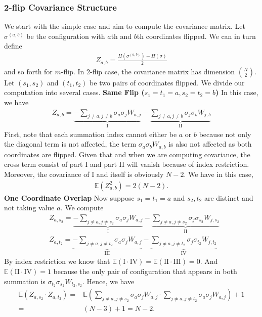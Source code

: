 \documentclass[10pt]{article}
\newcommand{\e}{\mathbb{E}}
\newenvironment{Proof of lemma}{\noindent{\bf Proof of Lemma}}{\hfill$\Box$\newline}
\newenvironment{Proof of claim}{\noindent{\bf Proof of claim}}{\hfill$\Box$\newline}
\newenvironment{Proof of theorem}{\noindent{\bf Proof of Theorem}}{\hfill\scriptsize{$\Box$}\newline}
\newenvironment{Proof of theorems}{\noindent{\bf Proof of Theorems}}{\hfill$\Box$\newline}
\newenvironment{Proof of proposition}{\noindent{\bf Proof of Proposition}}{\hfill$\Box$\newline}
\newenvironment{Proof of propositions}{\noindent{\bf Proof of Propositions}}{\hfill$\Box$\newline}
\newenvironment{Proof of exercise}{\noindent{\it Proof of Exercise:}}{\hfill$\Box$}
\numberwithin{equation}{section}
\begin{document}
\subsubsection{2-flip Covariance Structure}
We start with the simple case and aim to compute the covariance matrix. Let $\sigma^{(a,b)}$ be the configuration with $a$th and $b$th coordinates flipped. We can in turn define 
\begin{align}
    Z_{a,b}=\frac{H(\sigma^{(a,b)})-H(\sigma)}{2}
\end{align}
and so forth for $m$-flip. In 2-flip case, the covariance matrix has dimension ${N \choose 2}$. Let $(s_1,s_2)$ and $(t_1,t_2)$ be two pairs of coordinates flipped. We divide our computation into several cases.
\textbf{Same Flip ($s_1 = t_1=a, s_2 = t_2=b$)} In this case, we have
\begin{align}
    Z_{a,b} = \underbrace{- \sum_{j \neq a, j \neq b} \sigma_a \sigma_j W_{a,j}}_\text{I} - \underbrace{\sum_{j \neq a, j \neq b} \sigma_j \sigma_b W_{j,b}}_\text{II}
\end{align}
First, note that each summation index cannot either be $a$ or $b$ because not only the diagonal term is not affected, the term $\sigma_{a}\sigma_{b}W_{a,b}$ is also not affected as both coordinates are flipped. Given that and when we are computing covariance, the cross term consist of part I and part II will vanish because of index restriction. Moreover, the covariance of I and itself is obviously $N-2$. We have in this case,
\begin{align}
    \e(Z_{a,b}^2) = 2(N-2).
\end{align}
\textbf{One Coordinate Overlap} Now suppose $s_1=t_1=a$ and $s_2,t_2$ are distinct and not taking value $a$. We compute
\begin{align}
    &Z_{a,s_2} = \underbrace{- \sum_{j \neq a, j \neq s_2} \sigma_a \sigma_j W_{a,j}}_\text{I} - \underbrace{\sum_{j \neq a, j \neq s_2} \sigma_j \sigma_{s_2} W_{j,s_2}}_\text{II} \\
    &Z_{a,t_2} = \underbrace{- \sum_{j \neq a, j \neq t_2} \sigma_a \sigma_j W_{a,j}}_\text{III} - \underbrace{\sum_{j \neq a, j \neq t_2} \sigma_j \sigma_{t_2} W_{j,t_2}}_\text{IV}
\end{align}
By index restriction we know that $\e(\text{I} \cdot \text{IV}) = \e(\text{II} \cdot \text{III}) = 0$. And $\e(\text{II} \cdot \text{IV}) = 1$ because the only pair of configuration that appears in both summation is $\sigma_{t_2} \sigma_{s_2} W_{t_2,s_2}$. Hence, we have
\begin{align}
    \e(Z_{a,s_2} \cdot Z_{a,t_2}) =& \e\left(\sum_{j \neq a, j \neq s_2} \sigma_a \sigma_j W_{a,j} \cdot \sum_{j \neq a, j \neq t_2} \sigma_a \sigma_j W_{a,j}\right) + 1 \nonumber \\
    =& (N-3) + 1 = N - 2.
\end{align}
\end{document}
